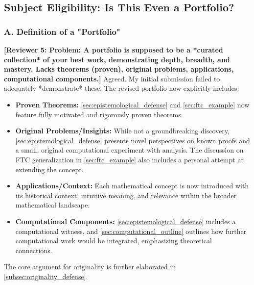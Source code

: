 \documentclass[11pt, a4paper]{article}
\theoremstyle{plain} %
\theoremstyle{definition} %
\theoremstyle{remark} %
\newcommand{\reviewer}[1]{\textcolor{reviewercolor}{\textbf{[Reviewer 5: #1]}}}
\begin{document}
\subsection{Subject Eligibility: Is This Even a Portfolio?}

\subsubsection*{A. Definition of a "Portfolio"}
\reviewer{Problem: A portfolio is supposed to be a *curated collection* of your best work, demonstrating depth, breadth, and mastery. Lacks theorems (proven), original problems, applications, computational components.}
Agreed. My initial submission failed to adequately *demonstrate* these. The revised portfolio now explicitly includes:
\begin{itemize}
    \item \textbf{Proven Theorems:} \ref{sec:epistemological_defense} and \ref{sec:ftc_example} now feature fully motivated and rigorously proven theorems.
    \item \textbf{Original Problems/Insights:} While not a groundbreaking discovery, \ref{sec:epistemological_defense} presents novel perspectives on known proofs and a small, original computational experiment with analysis. The discussion on FTC generalization in \ref{sec:ftc_example} also includes a personal attempt at extending the concept.
    \item \textbf{Applications/Context:} Each mathematical concept is now introduced with its historical context, intuitive meaning, and relevance within the broader mathematical landscape.
    \item \textbf{Computational Components:} \ref{sec:epistemological_defense} includes a computational witness, and \ref{sec:computational_outline} outlines how further computational work would be integrated, emphasizing theoretical connections.
\end{itemize}
The core argument for originality is further elaborated in \ref{subsec:originality_defense}.
\end{document}
